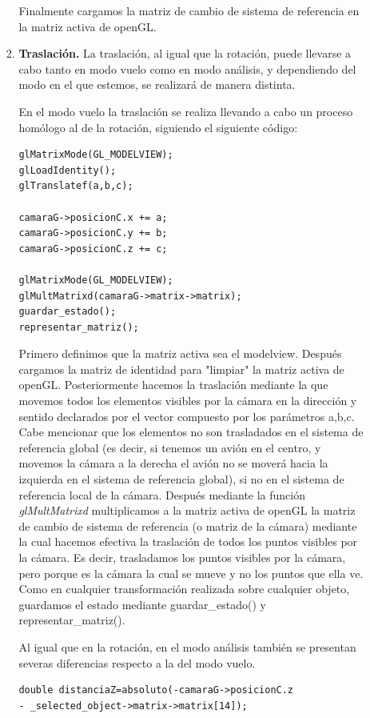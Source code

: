 \documentclass[12pt,a4paper]{article}
\begin{document}
\begin{enumerate}
\begin{enumerate}
\begin{enumerate}
Finalmente cargamos la matriz de cambio de sistema de referencia en la matriz activa de openGL.

\item \textbf{Traslación.}
La traslación, al igual que la rotación, puede llevarse a cabo tanto en modo vuelo como en modo análisis, y dependiendo del modo en el que estemos, se realizará de manera distinta.\newline

En el modo vuelo la traslación se realiza llevando a cabo un proceso homólogo al de la rotación, siguiendo el siguiente código:

\begin{lstlisting}
glMatrixMode(GL_MODELVIEW);
glLoadIdentity();
glTranslatef(a,b,c);

camaraG->posicionC.x += a;
camaraG->posicionC.y += b;
camaraG->posicionC.z += c;

glMatrixMode(GL_MODELVIEW);
glMultMatrixd(camaraG->matrix->matrix);
guardar_estado();
representar_matriz();
\end{lstlisting}
Primero definimos que la matriz activa sea el modelview. Después cargamos la matriz de identidad para "limpiar" la matriz activa de openGL. Posteriormente hacemos la traslación mediante la que movemos todos los elementos visibles por la cámara en la dirección y sentido declarados por el vector compuesto por los parámetros a,b,c. Cabe mencionar que los elementos no son trasladados en el sistema de referencia global (es decir, si tenemos un avión en el centro, y movemos la cámara a la derecha el avión no se moverá hacia la izquierda en el sistema de referencia global), si no en el sistema de referencia local de la cámara.\newline
Después mediante la función \textit{glMultMatrixd} multiplicamos a la matriz activa de openGL la matriz de cambio de sistema de referencia (o matriz de la cámara) mediante la cual hacemos efectiva la traslación de todos los puntos visibles por la cámara. Es decir, trasladamos los puntos visibles por la cámara, pero porque es la cámara la cual se mueve y no los puntos que ella ve.\newline
Como en cualquier transformación realizada sobre cualquier objeto, guardamos el estado mediante guardar\_estado() y representar\_matriz().
\newline

Al igual que en la rotación, en el modo análisis también se presentan severas diferencias respecto a la del modo vuelo.
\begin{lstlisting}
double distanciaZ=absoluto(-camaraG->posicionC.z
- _selected_object->matrix->matrix[14]);


\end{lstlisting}
\end{enumerate}
\end{enumerate}
\end{enumerate}
\end{document}
